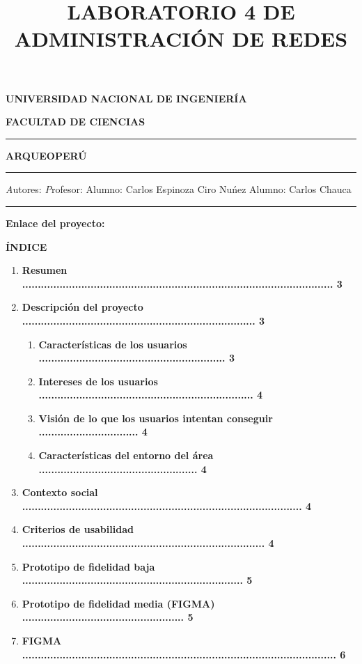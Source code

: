 \documentclass[12pt,a4paper]{report}
\title{LABORATORIO 4 DE ADMINISTRACI\'ON DE REDES}
\begin{document}
\begin{center} 
\textbf{\Huge  UNIVERSIDAD NACIONAL DE INGENIER\'IA}
\end{center}
\begin{center} 
\textbf{\LARGE FACULTAD DE CIENCIAS}
\end{center}
\hfill \break
\rule[2mm]{160mm}{0.4mm}
\hfill \break
\begin{center} 
\textbf{\huge ARQUEOPER\'U}
\end{center}
\hfill \break
\hfill \break
\rule[2mm]{160mm}{0.4mm}
\hfill \break
\hfill \break
{\textit Autores:} \hspace{7cm} {\textit Profesor:}
\hfill \break
\hfill \break
{Alumno: Carlos Espinoza} \hspace{3,9cm} { Ciro Nu\'nez}
\hfill \break
{Alumno: Carlos Chauca}
\hfill \break
\hfill \break
\hfill \break
\hfill \break
\hfill \break
\hfill \break
\hfill \break
\hfill \break
\hfill \break
\hfill \break
\hfill \break
\hfill \break
\hfill \break
\rule[2mm]{160mm}{0.4mm}
\hfill \break
\hfill \break
\begin{center}
{\textbf{\LARGE Enlace del proyecto:}}
\end{center}
\newpage
\begin{center}
\textbf{\'INDICE}
\end{center}
\begin{enumerate}[1.]
\item \textbf{Resumen .................................................................................................... 3}
\item \textbf{Descripci\'on del proyecto ........................................................................... 3}
\begin{enumerate}[2.1.]
\item \textbf{Caracter\'isticas de los usuarios ............................................................ 3}
\item \textbf{Intereses de los usuarios ..................................................................... 4}
\item \textbf{Visi\'on de lo que los usuarios intentan conseguir ................................ 4}
\item \textbf{Caracter\'isticas del entorno del \'area ................................................... 4}
\end{enumerate}
\item \textbf{Contexto social .......................................................................................... 4}
\item \textbf{Criterios de usabilidad .............................................................................. 4}
\item \textbf{Prototipo de fidelidad baja ....................................................................... 5}
\item \textbf{Prototipo de fidelidad media (FIGMA) .................................................... 5}
\item \textbf{FIGMA ..................................................................................................... 6}
\end{enumerate}
\end{document}
